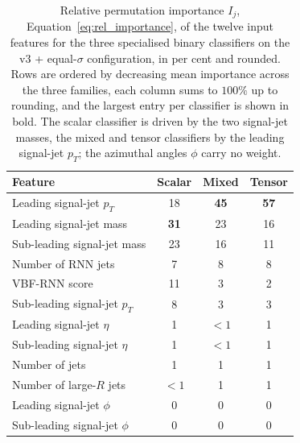 \begin{table}[htbp]
  \centering
  \caption{Relative permutation importance $I_j$, Equation~\ref{eq:rel_importance}, of the twelve input features for the three specialised binary classifiers on the v3 + equal-$\sigma$ configuration, in per cent and rounded. Rows are ordered by decreasing mean importance across the three families, each column sums to $100\%$ up to rounding, and the largest entry per classifier is shown in bold. The scalar classifier is driven by the two signal-jet masses, the mixed and tensor classifiers by the leading signal-jet $p_T$; the azimuthal angles $\phi$ carry no weight.}
  \label{tab:fr_rank_spec}
  \begin{tabular}{|l|c|c|c|}
    \hline
    \textbf{Feature} & \textbf{Scalar} & \textbf{Mixed} & \textbf{Tensor} \\
    \hline
    Leading signal-jet $p_T$      & 18 & \textbf{45} & \textbf{57} \\
    Leading signal-jet mass       & \textbf{31} & 23 & 16 \\
    Sub-leading signal-jet mass   & 23 & 16 & 11 \\
    Number of RNN jets            & 7  & 8  & 8 \\
    VBF-RNN score                 & 11 & 3  & 2 \\
    Sub-leading signal-jet $p_T$  & 8  & 3  & 3 \\
    Leading signal-jet $\eta$     & 1  & $<1$ & 1 \\
    Sub-leading signal-jet $\eta$ & 1  & $<1$ & 1 \\
    Number of jets                & 1  & 1  & 1 \\
    Number of large-$R$ jets      & $<1$ & 1 & 1 \\
    Leading signal-jet $\phi$     & 0  & 0  & 0 \\
    Sub-leading signal-jet $\phi$ & 0  & 0  & 0 \\
    \hline
  \end{tabular}
\end{table}

